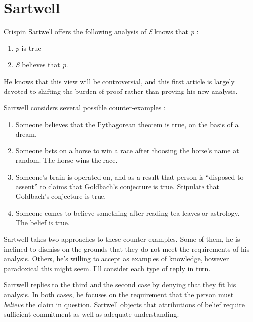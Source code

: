 \section{Sartwell}


Crispin Sartwell offers the following analysis of \textit{S} knows that \textit{p} \parencite[157]{sartwell1991}:

\begin{enumerate}
    \item \textit{p} is true
    \item \textit{S} believes that \textit{p}.
\end{enumerate}

He knows that this view will be controversial, and this first article is largely devoted to shifting the burden of proof rather than proving his new analysis.

Sartwell considers several possible counter-examples \parencite[158--159]{sartwell1991}:

\begin{enumerate}
    \item Someone believes that the Pythagorean theorem is true, on the basis of a dream.
    \item Someone bets on a horse to win a race after choosing the horse's name at random. The horse wins the race.
    \item Someone's brain is operated on, and as a result that person is ``disposed to assent'' to claims that Goldbach's conjecture is true. Stipulate that Goldbach's conjecture is true.
    \item Someone comes to believe something after reading tea leaves or astrology. The belief is true.
\end{enumerate}

Sartwell takes two approaches to these counter-examples. Some of them, he is inclined to dismiss on the grounds that they do not meet the requirements of his analysis. Others, he's willing to accept as examples of knowledge, however paradoxical this might seem. I'll consider each type of reply in turn.

Sartwell replies to the third and the second case by denying that they fit his analysis. In both cases, he focuses on the requirement that the person must \textit{believe} the claim in question. Sartwell objects that attributions of belief require sufficient commitment as well as adequate understanding.

